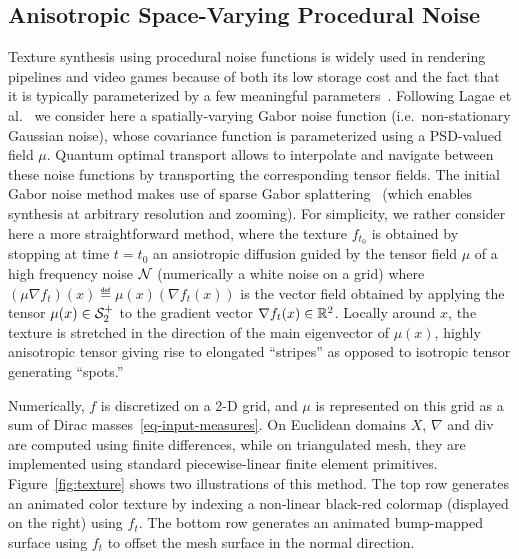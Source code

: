 
\subsection{Anisotropic Space-Varying Procedural Noise}




Texture synthesis using procedural noise functions is widely used in rendering pipelines and video games because of both its low storage cost and the fact that it is typically parameterized by a few meaningful parameters~\cite{LagaeSurvey}. 
%
Following Lagae et al.~ we consider here a spatially-varying Gabor noise function (i.e.\ non-stationary Gaussian noise), whose covariance function is parameterized using a PSD-valued field $\mu$. 
%
Quantum optimal transport allows to interpolate and navigate between these noise functions by transporting the corresponding tensor fields. 
%
The initial Gabor noise method makes use of sparse Gabor splattering~\cite{LagaeSurvey} (which enables synthesis at arbitrary resolution and zooming). For simplicity, we rather consider here a more straightforward method, where the texture $f_{t_0}$ is obtained by stopping at time $t=t_0$ an ansiotropic diffusion guided by the tensor field $\mu$  of a high frequency noise $\mathcal{N}$ (numerically a white noise on a grid)
where $(\mu \nabla f_t)(x) \eqdef \mu(x) (\nabla f_t(x))$ is the vector field obtained by applying the tensor $\mu(x) \in \mathcal{S}_2^+$ to the gradient vector $\nabla f_t(x) \in \mathbb{R}^2$. 
%
Locally around $x$, the texture is stretched in the direction of the main eigenvector of $\mu(x)$,  highly anisotropic tensor giving rise to elongated ``stripes'' as opposed to isotropic tensor generating ``spots.''

Numerically, $f$ is discretized on a 2-D grid, and $\mu$ is represented on this grid as a sum of Dirac masses~\eqref{eq-input-measures}. On Euclidean domains $X$, $\nabla$ and div are computed using finite differences, while on triangulated mesh, they are implemented using standard piecewise-linear finite element primitives. 
%
Figure~\ref{fig:texture} shows two illustrations of this method. The top row generates an animated color texture by indexing a non-linear black-red colormap (displayed on the right) using $f_t$. The bottom row generates an animated bump-mapped surface using $f_t$ to offset the mesh surface in the normal direction. 


